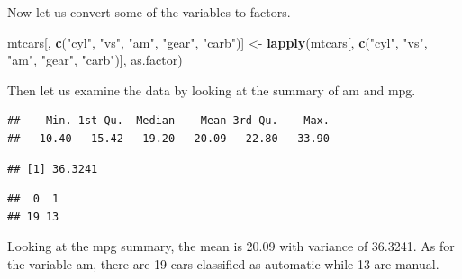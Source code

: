 \documentclass[]{article}
\newenvironment{Shaded}{\begin{snugshade}}{\end{snugshade}}
\newcommand{\KeywordTok}[1]{\textcolor[rgb]{0.13,0.29,0.53}{\textbf{#1}}}
\newcommand{\StringTok}[1]{\textcolor[rgb]{0.31,0.60,0.02}{#1}}
\newcommand{\OperatorTok}[1]{\textcolor[rgb]{0.81,0.36,0.00}{\textbf{#1}}}
\newcommand{\NormalTok}[1]{#1}
\begin{document}
Now let us convert some of the variables to factors.

\begin{Shaded}
\begin{Highlighting}[]
\NormalTok{mtcars[, }\KeywordTok{c}\NormalTok{(}\StringTok{"cyl"}\NormalTok{, }\StringTok{"vs"}\NormalTok{, }\StringTok{"am"}\NormalTok{, }\StringTok{"gear"}\NormalTok{, }\StringTok{"carb"}\NormalTok{)] <-}\StringTok{ }\KeywordTok{lapply}\NormalTok{(mtcars[, }\KeywordTok{c}\NormalTok{(}\StringTok{"cyl"}\NormalTok{, }\StringTok{"vs"}\NormalTok{, }\StringTok{"am"}\NormalTok{, }\StringTok{"gear"}\NormalTok{, }\StringTok{"carb"}\NormalTok{)], as.factor)}
\end{Highlighting}
\end{Shaded}

Then let us examine the data by looking at the summary of am and mpg.

\begin{Shaded}
\end{Shaded}

\begin{verbatim}
##    Min. 1st Qu.  Median    Mean 3rd Qu.    Max. 
##   10.40   15.42   19.20   20.09   22.80   33.90
\end{verbatim}

\begin{Shaded}
\end{Shaded}

\begin{verbatim}
## [1] 36.3241
\end{verbatim}

\begin{Shaded}
\end{Shaded}

\begin{verbatim}
##  0  1 
## 19 13
\end{verbatim}

Looking at the mpg summary, the mean is 20.09 with variance of 36.3241.
As for the variable am, there are 19 cars classified as automatic while
13 are manual.
\end{document}
